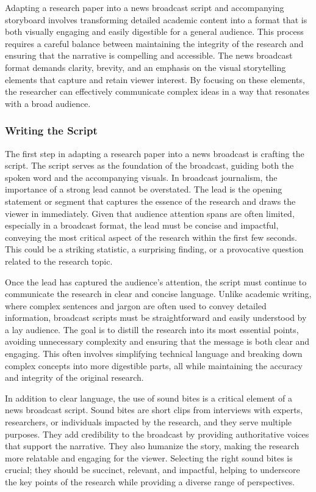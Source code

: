 \documentclass[
]{book}
\begin{document}
Adapting a research paper into a news broadcast script and accompanying storyboard involves transforming detailed academic content into a format that is both visually engaging and easily digestible for a general audience. This process requires a careful balance between maintaining the integrity of the research and ensuring that the narrative is compelling and accessible. The news broadcast format demands clarity, brevity, and an emphasis on the visual storytelling elements that capture and retain viewer interest. By focusing on these elements, the researcher can effectively communicate complex ideas in a way that resonates with a broad audience.

\subsubsection*{Writing the Script}\label{writing-the-script}

The first step in adapting a research paper into a news broadcast is crafting the script. The script serves as the foundation of the broadcast, guiding both the spoken word and the accompanying visuals. In broadcast journalism, the importance of a strong lead cannot be overstated. The lead is the opening statement or segment that captures the essence of the research and draws the viewer in immediately. Given that audience attention spans are often limited, especially in a broadcast format, the lead must be concise and impactful, conveying the most critical aspect of the research within the first few seconds. This could be a striking statistic, a surprising finding, or a provocative question related to the research topic.

Once the lead has captured the audience's attention, the script must continue to communicate the research in clear and concise language. Unlike academic writing, where complex sentences and jargon are often used to convey detailed information, broadcast scripts must be straightforward and easily understood by a lay audience. The goal is to distill the research into its most essential points, avoiding unnecessary complexity and ensuring that the message is both clear and engaging. This often involves simplifying technical language and breaking down complex concepts into more digestible parts, all while maintaining the accuracy and integrity of the original research.

In addition to clear language, the use of sound bites is a critical element of a news broadcast script. Sound bites are short clips from interviews with experts, researchers, or individuals impacted by the research, and they serve multiple purposes. They add credibility to the broadcast by providing authoritative voices that support the narrative. They also humanize the story, making the research more relatable and engaging for the viewer. Selecting the right sound bites is crucial; they should be succinct, relevant, and impactful, helping to underscore the key points of the research while providing a diverse range of perspectives.
\end{document}
